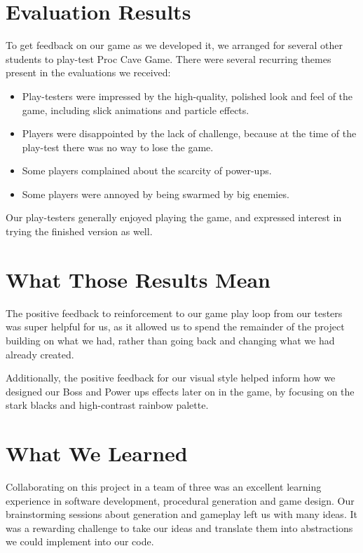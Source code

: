 \documentclass[a4paper, 12pt]{article}
\begin{document}
\section{Evaluation Results}

To get feedback on our game as we developed it, we arranged for several other
students to play-test Proc Cave Game. There were several recurring themes
present in the evaluations we received:

\begin{itemize}
	\item Play-testers were impressed by the high-quality, polished look and
		feel of the game, including slick animations and particle effects.
	\item Players were disappointed by the lack of challenge, because at the
		time of the play-test there was no way to lose the game.
	\item Some players complained about the scarcity of power-ups.
	\item Some players were annoyed by being swarmed by big enemies.
\end{itemize}

Our play-testers generally enjoyed playing the game, and expressed interest in
trying the finished version as well.

\section{What Those Results Mean}

The positive feedback to reinforcement to our game play loop from our testers was
super helpful for us, as it allowed us to spend the remainder of the project
building on what we had, rather than going back and changing what we had already
created.

Additionally, the positive feedback for our visual style helped inform how we
designed our Boss and Power ups effects later on in the game, by focusing on the
stark blacks and high-contrast rainbow palette.

\section{What We Learned}

Collaborating on this project in a team of three was an excellent learning
experience in software development, procedural generation and game design. Our
brainstorming sessions about generation and gameplay left us with many ideas. It
was a rewarding challenge to take our ideas and translate them into abstractions
we could implement into our code.
\end{document}
